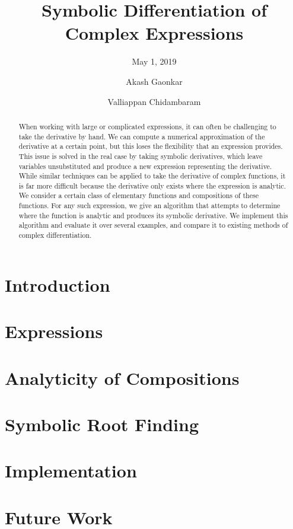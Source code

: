 \documentclass[sigplan]{acmart}
\title{Symbolic Differentiation of Complex Expressions}
\subtitle{May 1, 2019}
\author{Akash Gaonkar}
\affiliation{Undergraduate Student, \institution{University of Colorado at Boulder}}
\author{Valliappan Chidambaram}
\affiliation{Undergraduate Student, \institution{University of Colorado at Boulder}}
\begin{document}
  \begin{abstract}
		When working with large or complicated expressions, it can often be challenging to take the derivative by hand. We can compute a numerical approximation of the derivative at a certain point, but this loses the flexibility that an expression provides. This issue is solved in the real case by taking symbolic derivatives, which leave variables unsubstituted and produce a new expression representing the derivative. While similar techniques can be applied to take the derivative of complex functions, it is far more difficult because the derivative only exists where the expression is analytic. We consider a certain class of elementary functions and compositions of these functions. For any such expression, we give an algorithm that attempts to determine where the function is analytic and produces its symbolic derivative. We implement this algorithm and evaluate it over several examples, and compare it to existing methods of complex differentiation.
  \end{abstract}

  \maketitle

  \section{Introduction}
  \label{sec:introduction}
  

  \section{Expressions}
  \label{sec:expressions}
  

  \section{Analyticity of Compositions}
  \label{sec:analyticity}
  

  \section{Symbolic Root Finding}
  \label{sec:rootfinding}
  

  \section{Implementation}
  \label{sec:implementation}
  

  \section{Future Work}
  \label{sec:futurework}
  
\end{document}
